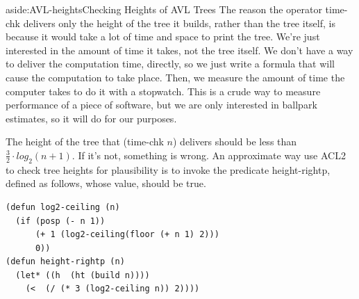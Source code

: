 \begin{aside}{aside:AVL-heights}{Checking Heights of AVL Trees}
The reason the operator \textsf{time-chk} delivers only the height
of the tree it builds, rather than the tree itself, is
because it would take a lot of time and space to print the tree.
We're just interested in the amount of time it takes,
not the tree itself.
We don't have a way to deliver the computation time, directly,
so we just write a formula that will cause the computation to take place.
Then, we measure the amount of time the computer takes to do it
with a stopwatch.
This is a crude way to measure performance of a piece of software,
but we are only interested in ballpark estimates,
so it will do for our purposes.

The height of the tree
that \textsf{(time-chk $n$)} delivers should be
less than
$\frac{3}{2}\cdot log_2(n+1)$.
If it's not, something is wrong.
An approximate way use ACL2 to check tree heights
for plausibility is to invoke the predicate \textsf{height-rightp},
defined as follows, whose value, should be true.

\begin{center}
\begin{code}
\begin{verbatim}
(defun log2-ceiling (n)
  (if (posp (- n 1))
      (+ 1 (log2-ceiling(floor (+ n 1) 2)))
      0))
(defun height-rightp (n)
  (let* ((h  (ht (build n))))
    (<  (/ (* 3 (log2-ceiling n)) 2))))
\end{verbatim}
\end{code}
\end{center}
\end{aside}

\begin{exercises}


\end{exercises}


